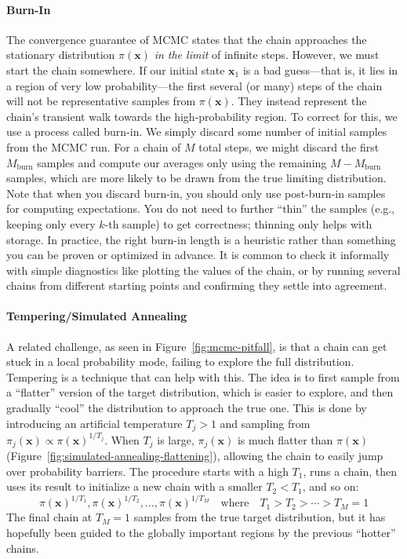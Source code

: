 \paragraph*{Burn-In}
The convergence guarantee of MCMC states that the chain approaches the stationary distribution $\pi(\mathbf{x})$ \emph{in the limit} of infinite steps. However, we must start the chain somewhere. If our initial state $\mathbf{x}_1$ is a bad guess---that is, it lies in a region of very low probability---the first several (or many) steps of the chain will not be representative samples from $\pi(\mathbf{x})$. They instead represent the chain's transient walk towards the high-probability region. To correct for this, we use a process called burn-in. We simply discard some number of initial samples from the MCMC run. For a chain of $M$ total steps, we might discard the first $M_{\text{burn}}$ samples and compute our averages only using the remaining $M - M_{\text{burn}}$ samples, which are more likely to be drawn from the true limiting distribution. Note that when you discard burn-in, you should only use post-burn-in samples for computing expectations. You do not need to further ``thin'' the samples (e.g., keeping only every $k$-th sample) to get correctness; thinning only helps with storage. In practice, the right burn-in length is a heuristic rather than something you can be proven or optimized in advance. It is common to check it informally with simple diagnostics like plotting the values of the chain, or by running several chains from different starting points and confirming they settle into agreement.

\paragraph*{Tempering/Simulated Annealing}
A related challenge, as seen in Figure~\ref{fig:mcmc-pitfall}, is that a chain can get stuck in a local probability mode, failing to explore the full distribution. Tempering is a technique that can help with this. The idea is to first sample from a ``flatter'' version of the target distribution, which is easier to explore, and then gradually ``cool'' the distribution to approach the true one. This is done by introducing an artificial temperature $T_j > 1$ and sampling from $\pi_j(\mathbf{x}) \propto \pi(\mathbf{x})^{1/T_j}$. When $T_j$ is large, $\pi_j(\mathbf{x})$ is much flatter than $\pi(\mathbf{x})$ (Figure~\ref{fig:simulated-annealing-flattening}), allowing the chain to easily jump over probability barriers. The procedure starts with a high $T_1$, runs a chain, then uses its result to initialize a new chain with a smaller $T_2 < T_1$, and so on:
\begin{equation}
    \pi(\mathbf{x})^{1/T_1}, \pi(\mathbf{x})^{1/T_2}, \ldots, \pi(\mathbf{x})^{1/T_M} \quad \text{where} \quad T_1 > T_2 > \cdots > T_M = 1
\end{equation}
The final chain at $T_M=1$ samples from the true target distribution, but it has hopefully been guided to the globally important regions by the previous ``hotter'' chains. 

